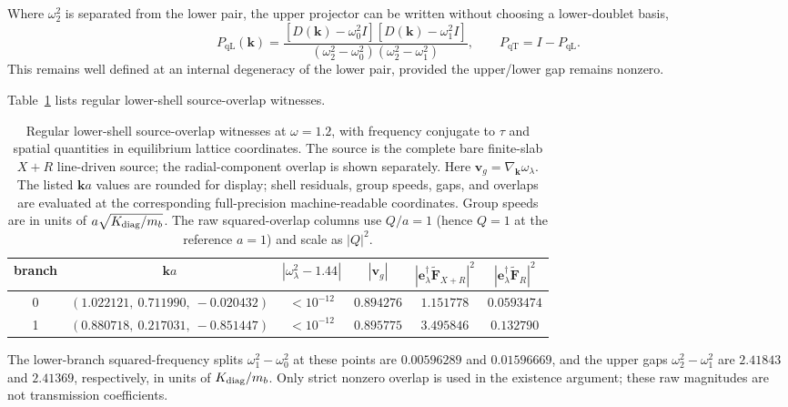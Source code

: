 \documentclass[10pt,aps,onecolumn,notitlepage,nofootinbib]{revtex4-2}
\newcommand{\vk}{\bm k}
\newcommand{\qT}{\mathrm{qT}}
\newcommand{\qL}{\mathrm{qL}}
\begin{document}
Where $\omega_2^2$ is separated from the lower pair, the upper projector can be written without choosing a lower-doublet basis,
\begin{equation}
 P_{\qL}(\vk)=
 \frac{[D(\vk)-\omega_0^2I][D(\vk)-\omega_1^2I]}
 {(\omega_2^2-\omega_0^2)(\omega_2^2-\omega_1^2)},
 \qquad P_{\qT}=I-P_{\qL}.
\end{equation}
This remains well defined at an internal degeneracy of the lower pair, provided the upper/lower gap remains nonzero.

Table~\ref{tab:sm-source-witnesses} lists regular lower-shell source-overlap witnesses.

\begin{table}[htbp]
\caption{Regular lower-shell source-overlap witnesses at $\omega=1.2$, with frequency conjugate to $\tau$ and spatial quantities in equilibrium lattice coordinates. The source is the complete bare finite-slab $X+R$ line-driven source; the radial-component overlap is shown separately. Here $\bm v_g=\nabla_{\bm k}\omega_\lambda$. The listed $\bm k a$ values are rounded for display; shell residuals, group speeds, gaps, and overlaps are evaluated at the corresponding full-precision machine-readable coordinates. Group speeds are in units of $a\sqrt{K_{\rm diag}/m_b}$. The raw squared-overlap columns use $Q/a=1$ (hence $Q=1$ at the reference $a=1$) and scale as $|Q|^2$.}
\label{tab:sm-source-witnesses}
\begin{ruledtabular}
\begin{tabular}{c c c c c c}
branch & $\bm k a$ & $|\omega_\lambda^2-1.44|$ & $|\bm v_g|$ & $|\bm e_\lambda^\dagger\widetilde{\bm F}_{X+R}|^2$ & $|\bm e_\lambda^\dagger\widetilde{\bm F}_{R}|^2$\\
\hline
0 & $(1.022121,\ 0.711990,\ -0.020432)$ & $<10^{-12}$ & $0.894276$ & $1.151778$ & $0.0593474$\\
1 & $(0.880718,\ 0.217031,\ -0.851447)$ & $<10^{-12}$ & $0.895775$ & $3.495846$ & $0.132790$\\
\end{tabular}
\end{ruledtabular}
\end{table}
The lower-branch squared-frequency splits $\omega_1^2-\omega_0^2$ at these points are $0.00596289$ and $0.01596669$, and the upper gaps $\omega_2^2-\omega_1^2$ are $2.41843$ and $2.41369$, respectively, in units of $K_{\rm diag}/m_b$. Only strict nonzero overlap is used in the existence argument; these raw magnitudes are not transmission coefficients.
\end{document}
